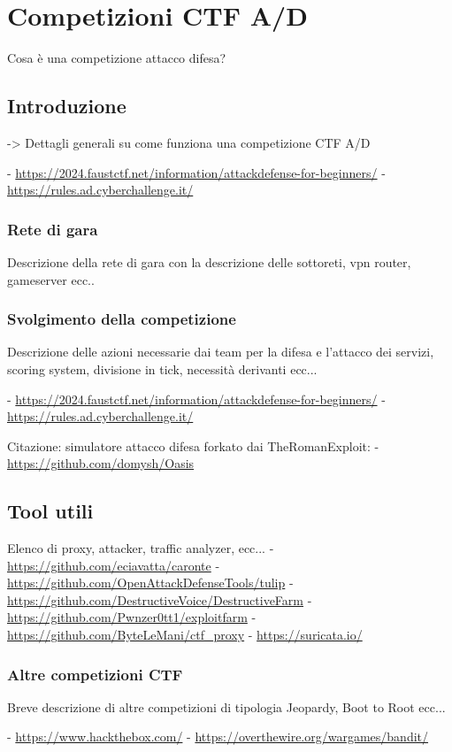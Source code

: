 \chapter{Competizioni CTF A/D}

Cosa è una competizione attacco difesa?

\section{Introduzione}

-> Dettagli generali su come funziona una competizione CTF A/D

- \url{https://2024.faustctf.net/information/attackdefense-for-beginners/}
- \url{https://rules.ad.cyberchallenge.it/}

\subsection{Rete di gara}

Descrizione della rete di gara con la descrizione delle sottoreti, vpn router, gameserver ecc..

\subsection{Svolgimento della competizione}

Descrizione delle azioni necessarie dai team per la difesa e l'attacco dei servizi, scoring
system, divisione in tick, necessità derivanti ecc...

- \url{https://2024.faustctf.net/information/attackdefense-for-beginners/}
- \url{https://rules.ad.cyberchallenge.it/}

Citazione: simulatore attacco difesa forkato dai TheRomanExploit: - \url{https://github.com/domysh/Oasis}

\section{Tool utili}

Elenco di proxy, attacker, traffic analyzer, ecc...
- \url{https://github.com/eciavatta/caronte}
- \url{https://github.com/OpenAttackDefenseTools/tulip}
- \url{https://github.com/DestructiveVoice/DestructiveFarm}
- \url{https://github.com/Pwnzer0tt1/exploitfarm}
- \url{https://github.com/ByteLeMani/ctf_proxy}
- \url{https://suricata.io/}

\subsection{Altre competizioni CTF}

Breve descrizione di altre competizioni di tipologia Jeopardy, Boot to Root ecc...

- \url{https://www.hackthebox.com/}
- \url{https://overthewire.org/wargames/bandit/}
